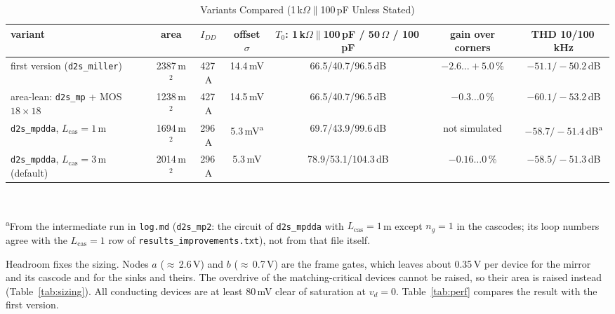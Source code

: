 \documentclass[journal]{IEEEtran}
\newcommand{\cell}[1]{\texttt{#1}}
\newcommand{\um}{\,\textmu m}
\newcommand{\umsq}{\,\textmu m$^2$}
\newcommand{\uA}{\,\textmu A}
\newcommand{\mV}{\,mV}
\newcommand{\dB}{\,dB}
\newcommand{\pF}{\,pF}
\newcommand{\Ohm}{\,$\Omega$}
\newcommand{\RL}{1\,k$\Omega\parallel$100\,pF}
\begin{document}
\begin{table}[!t]
\caption{Variants Compared (\RL{} Unless Stated)}
\label{tab:opt}
\centering\footnotesize
\begin{tabular}{@{}lcccccc@{}}
\toprule
variant & area & $I_{DD}$ & offset $\sigma$ & $T_0$: \RL{} / 50\Ohm{} / 100\pF & gain over corners & THD 10/100\,kHz\\
\midrule
first version (\cell{d2s\_miller}) & 2387\umsq & 427\uA & 14.4\mV & 66.5/40.7/96.5\dB & $-2.6\ldots+5.0$\,\% & $-51.1/-50.2$\dB\\
area-lean: \cell{d2s\_mp} + MOS $18\times18$ & 1238\umsq & 427\uA & 14.5\mV & 66.5/40.7/96.5\dB & $-0.3\ldots0$\,\% & $-60.1/-53.2$\dB\\
\cell{d2s\_mpdda}, $L_\mathrm{cas}=1$\um & 1694\umsq & 296\uA & 5.3\mV\textsuperscript{a} & 69.7/43.9/99.6\dB & not simulated & $-58.7/-51.4$\dB\textsuperscript{a}\\
\cell{d2s\_mpdda}, $L_\mathrm{cas}=3$\um{} (default) & 2014\umsq & 296\uA & 5.3\mV & 78.9/53.1/104.3\dB & $-0.16\ldots0$\,\% & $-58.5/-51.3$\dB\\
\bottomrule
\end{tabular}\\[2pt]
\parbox{\textwidth}{\footnotesize \textsuperscript{a}From the intermediate run in
\cell{log.md} (\cell{d2s\_mp2}: the circuit of \cell{d2s\_mpdda} with $L_\mathrm{cas}=1$\um{}
except $n_g=1$ in the cascodes; its loop numbers agree with the $L_\mathrm{cas}=1$ row of
\cell{results\_improvements.txt}), not from that file itself.}
\end{table}

Headroom fixes the sizing. Nodes $a$ ($\approx$\,2.6\,V) and $b$ ($\approx$\,0.7\,V) are the
frame gates, which leaves about 0.35\,V per device for the mirror and its cascode and for the
sinks and theirs. The overdrive of the matching-critical devices cannot be raised, so their
area is raised instead (Table~\ref{tab:sizing}). All conducting devices are at least 80\mV{}
clear of saturation at $v_d=0$. Table~\ref{tab:perf} compares the result with the first
version.
\end{document}
